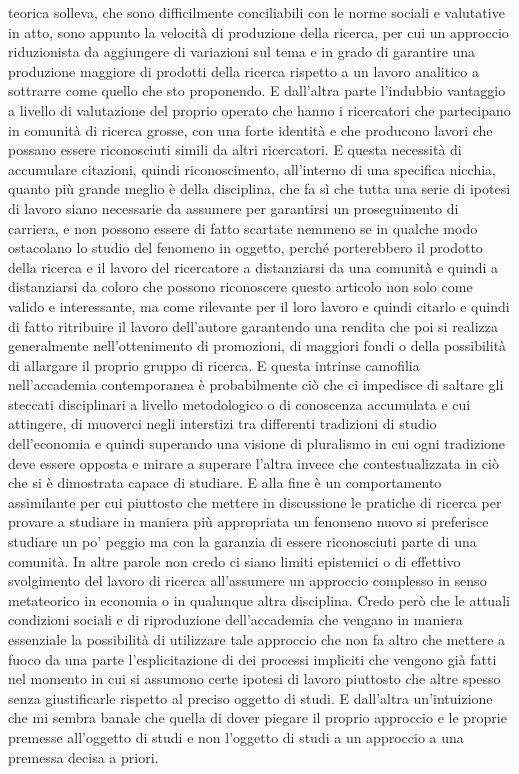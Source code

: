 \documentclass[a4paper, headings=standardclasses]{scrartcl}
\begin{document}
teorica solleva, che sono difficilmente conciliabili con le norme sociali e valutative in atto,
sono appunto la velocità di produzione della ricerca, per cui un approccio riduzionista
da aggiungere di variazioni sul tema e in grado di garantire una produzione maggiore di prodotti
della ricerca rispetto a un lavoro analitico a sottrarre come quello che sto proponendo.
E dall'altra parte l'indubbio vantaggio a livello di valutazione del proprio operato che hanno i
ricercatori che partecipano in comunità di ricerca grosse, con una forte identità e che
producono lavori che possano essere riconosciuti simili da altri ricercatori.
E questa necessità di accumulare citazioni, quindi riconoscimento, all'interno di una
specifica nicchia, quanto più grande meglio è della disciplina, che fa sì che tutta una serie
di ipotesi di lavoro siano necessarie da assumere per garantirsi un proseguimento di carriera,
e non possono essere di fatto scartate nemmeno se in qualche modo ostacolano lo studio del
fenomeno in oggetto, perché porterebbero il prodotto della ricerca e il lavoro del ricercatore
a distanziarsi da una comunità e quindi a distanziarsi da coloro che possono riconoscere
questo articolo non solo come valido e interessante, ma come rilevante per il loro lavoro e quindi
citarlo e quindi di fatto ritribuire il lavoro dell'autore garantendo una rendita che poi si
realizza generalmente nell'ottenimento di promozioni, di maggiori fondi o della possibilità
di allargare il proprio gruppo di ricerca. E questa intrinse camofilia nell'accademia contemporanea
è probabilmente ciò che ci impedisce di saltare gli steccati disciplinari a livello metodologico
o di conoscenza accumulata e cui attingere, di muoverci negli interstizi tra differenti tradizioni
di studio dell'economia e quindi superando una visione di pluralismo in cui ogni tradizione
deve essere opposta e mirare a superare l'altra invece che contestualizzata in ciò che si è
dimostrata capace di studiare. E alla fine è un comportamento assimilante per cui piuttosto
che mettere in discussione le pratiche di ricerca per provare a studiare in maniera più appropriata
un fenomeno nuovo si preferisce studiare un po' peggio ma con la garanzia di essere riconosciuti
parte di una comunità. In altre parole non credo ci siano limiti epistemici o di effettivo svolgimento
del lavoro di ricerca all'assumere un approccio complesso in senso metateorico in economia o in qualunque
altra disciplina. Credo però che le attuali condizioni sociali e di riproduzione dell'accademia
che vengano in maniera essenziale la possibilità di utilizzare tale approccio che non fa altro che
mettere a fuoco da una parte l'esplicitazione di dei processi impliciti che vengono già fatti
nel momento in cui si assumono certe ipotesi di lavoro piuttosto che altre spesso senza giustificarle
rispetto al preciso oggetto di studi. E dall'altra un'intuizione che mi sembra banale
che quella di dover piegare il proprio approccio e le proprie premesse all'oggetto di studi
e non l'oggetto di studi a un approccio a una premessa decisa a priori.

\printbibliography

	
\end{document}
